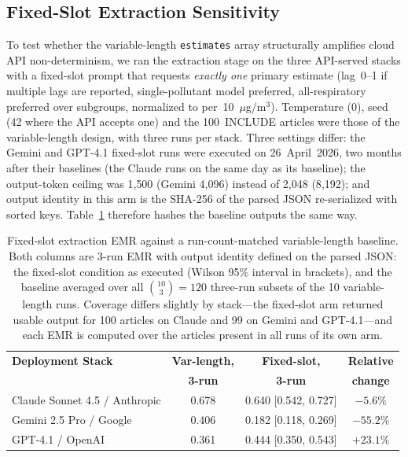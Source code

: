 \documentclass[preprint,review,12pt,authoryear]{elsarticle}
\begin{document}
\subsection{Fixed-Slot Extraction Sensitivity}
\label{sec:fixedslot}

To test whether the variable-length \texttt{estimates} array structurally amplifies cloud API non-determinism, we ran the extraction stage on the three API-served stacks with a fixed-slot prompt that requests \emph{exactly one} primary estimate (lag~0--1 if multiple lags are reported, single-pollutant model preferred, all-respiratory preferred over subgroups, normalized to per~10~$\mu$g/m$^3$).
Temperature (0), seed (42 where the API accepts one) and the 100~INCLUDE articles were those of the variable-length design, with three runs per stack. Three settings differ: the Gemini and GPT-4.1 fixed-slot runs were executed on 26~April~2026, two months after their baselines (the Claude runs on the same day as its baseline); the output-token ceiling was 1{,}500 (Gemini 4{,}096) instead of 2{,}048 (8{,}192); and output identity in this arm is the SHA-256 of the parsed JSON re-serialized with sorted keys. Table~\ref{tab:fixedslot} therefore hashes the baseline outputs the same way.

\begin{table}[htbp]
\centering
\caption{Fixed-slot extraction EMR against a run-count-matched variable-length baseline. Both columns are 3-run EMR with output identity defined on the parsed JSON: the fixed-slot condition as executed (Wilson 95\% interval in brackets), and the baseline averaged over all $\binom{10}{3}{=}120$ three-run subsets of the 10 variable-length runs. Coverage differs slightly by stack---the fixed-slot arm returned usable output for 100 articles on Claude and 99 on Gemini and GPT-4.1---and each EMR is computed over the articles present in all runs of its own arm.}
\label{tab:fixedslot}
\small
\setlength{\tabcolsep}{4pt}
\begin{tabular}{lccc}
\toprule
\textbf{Deployment Stack} & \textbf{Var-length,} & \textbf{Fixed-slot,} & \textbf{Relative} \\
 & \textbf{3-run} & \textbf{3-run} & \textbf{change} \\
\midrule
Claude Sonnet 4.5 / Anthropic & 0.678 & 0.640 [0.542, 0.727] & $-5.6\%$ \\
Gemini 2.5 Pro / Google       & 0.406 & 0.182 [0.118, 0.269] & $-55.2\%$ \\
GPT-4.1 / OpenAI              & 0.361 & 0.444 [0.350, 0.543] & $+23.1\%$ \\
\bottomrule
\end{tabular}
\end{table}
\end{document}
